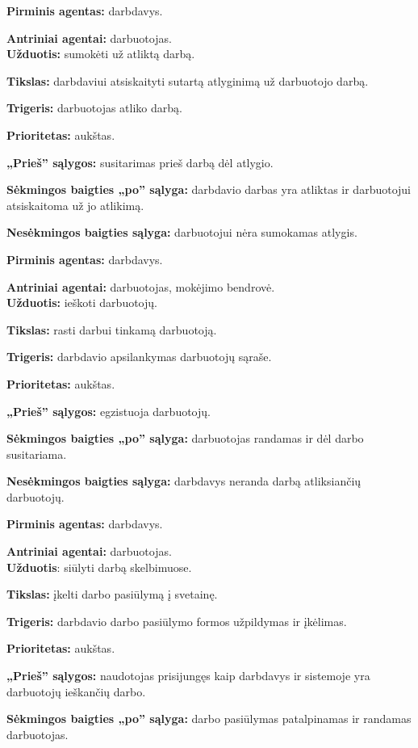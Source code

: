 \documentclass{VUMIFPSkursinis}
\begin{document}
\textbf{Pirminis agentas:} darbdavys.

\textbf{Antriniai agentai:} darbuotojas.
\\

\textbf{Užduotis:} sumokėti už atliktą darbą.

\textbf{Tikslas:} darbdaviui atsiskaityti sutartą atlyginimą už darbuotojo darbą.

\textbf{Trigeris:} darbuotojas atliko darbą.

\textbf{Prioritetas:} aukštas.

\textbf{„Prieš” sąlygos:} susitarimas prieš darbą dėl atlygio.

\textbf{Sėkmingos baigties „po” sąlyga:} darbdavio darbas yra atliktas ir darbuotojui atsiskaitoma už jo atlikimą.

\textbf{Nesėkmingos baigties sąlyga:} darbuotojui nėra sumokamas atlygis.

\textbf{Pirminis agentas:} darbdavys.

\textbf{Antriniai agentai:} darbuotojas, mokėjimo bendrovė.
\\

\textbf{Užduotis:} ieškoti darbuotojų.

\textbf{Tikslas:} rasti darbui tinkamą darbuotoją.

\textbf{Trigeris:} darbdavio apsilankymas darbuotojų sąraše.

\textbf{Prioritetas:} aukštas.

\textbf{„Prieš” sąlygos:} egzistuoja darbuotojų.

\textbf{Sėkmingos baigties „po” sąlyga:} darbuotojas randamas ir dėl darbo susitariama.

\textbf{Nesėkmingos baigties sąlyga:} darbdavys neranda darbą atliksiančių darbuotojų.

\textbf{Pirminis agentas:} darbdavys.

\textbf{Antriniai agentai:} darbuotojas.
\\

\textbf{Užduotis}: siūlyti darbą skelbimuose.

\textbf{Tikslas:} įkelti darbo pasiūlymą į svetainę.

\textbf{Trigeris:} darbdavio darbo pasiūlymo formos užpildymas ir įkėlimas.

\textbf{Prioritetas:} aukštas.

\textbf{„Prieš” sąlygos:} naudotojas prisijungęs kaip darbdavys ir sistemoje yra darbuotojų ieškančių darbo.

\textbf{Sėkmingos baigties „po” sąlyga:} darbo pasiūlymas patalpinamas ir randamas darbuotojas.
\end{document}
